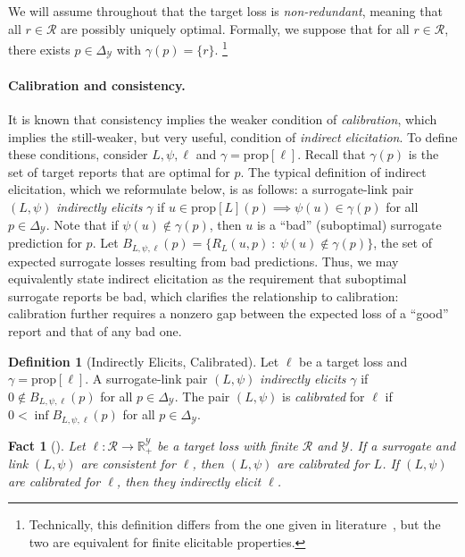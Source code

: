 \documentclass{article}
\newtheorem{fact}{Fact}
\theoremstyle{definition}\newtheorem{definition}{Definition}
\theoremstyle{definition}\newtheorem{assumption}{Assumption}
\newcommand{\reals}{\mathbb{R}}
\newcommand{\prop}[1]{\mathrm{prop}[#1]}
\newcommand{\simplex}{\Delta_\Y}
\newcommand{\R}{\mathcal{R}}
\newcommand{\Y}{\mathcal{Y}}
\begin{document}
We will assume throughout that the target loss is \emph{non-redundant}, meaning that all $r \in \R$ are possibly uniquely optimal.
Formally, we suppose that for all $r \in \R$, there exists $p \in \simplex$ with $\gamma(p) = \{r\}$.%
\footnote{Technically, this definition differs from the one given in literature~\cite{frongillo2014general,finocchiaro2019embedding}, but the two are equivalent for finite elicitable properties.}

\paragraph{Calibration and consistency.}
It is known that consistency implies the weaker condition of \emph{calibration}, which implies the still-weaker, but very useful, condition of \emph{indirect elicitation}.
To define these conditions, consider $L,\psi,\ell$ and $\gamma = \prop{\ell}$.
Recall that $\gamma(p)$ is the set of target reports that are optimal for $p$.
The typical definition of indirect elicitation, which we reformulate below, is as follows: a surrogate-link pair $(L,\psi)$ \emph{indirectly elicits} $\gamma$ if $u \in \prop{L}(p) \implies \psi(u) \in \gamma(p)$ for all $p \in \simplex$.
Note that if $\psi(u) \not\in \gamma(p)$, then $u$ is a ``bad'' (suboptimal) surrogate prediction for $p$.
Let $B_{L,\psi,\ell}(p) = \{R_L(u,p) ~:~ \psi(u) \not\in \gamma(p)\}$, the set of expected surrogate losses resulting from bad predictions.
Thus, we may equivalently state indirect elicitation as the requirement that suboptimal surrogate reports be bad, which clarifies the relationship to calibration:
calibration further requires a nonzero gap between the expected loss of a ``good'' report and that of any bad one.
\begin{definition}[Indirectly Elicits, Calibrated]
  Let $\ell$ be a target loss and $\gamma = \prop{\ell}$.
  A surrogate-link pair $(L,\psi)$ \emph{indirectly elicits} $\gamma$ if $0 \not\in B_{L,\psi,\ell}(p)$ for all $p \in \simplex$.
  The pair $(L,\psi)$ is \emph{calibrated} for $\ell$ if $0 < \inf B_{L,\psi,\ell}(p)$ for all $p \in \simplex$.
\end{definition}
\begin{fact}[\cite{bartlett2006convexity,steinwart2008support}]
  \label{fact:consistent-calibrated-elicits}
  Let $\ell: \R \to \reals_+^{\Y}$ be a target loss with finite $\R$ and $\Y$.
  If a surrogate and link $(L,\psi)$ are consistent for $\ell$, then $(L,\psi)$ are calibrated for $L$.
  If $(L,\psi)$ are calibrated for $\ell$, then they indirectly elicit $\ell$.
\end{fact}
\end{document}
